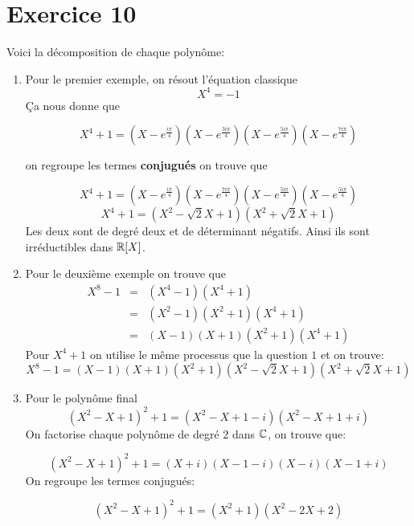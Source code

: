 \documentclass{report}
\begin{document}
\section{Exercice 10}
\begin{myproof}
  Voici la décomposition  de chaque polynôme:

  \begin{enumerate}
    \item Pour le premier exemple, on résout  l'équation classique
      $$
      X^4 = -1
      $$
      Ça nous donne que 

      $$
      X^4 + 1 = (X-e^{\frac{i\pi}{4}})(X-e^{\frac{3i\pi}{4}})(X-e^{\frac{5i\pi}{4}})(X-e^{\frac{7i\pi}{4}})
      $$

      on regroupe les termes \textbf{conjugués} on trouve que

      $$
      X^4 + 1 =(X-e^{\frac{i\pi}{4}})(X-e^{\frac{7i\pi}{4}}) (X-e^{\frac{5i\pi}{4}})(X-e^{\frac{5i\pi}{4}})
      $$ $$ X^4 + 1 = (X^2 - \sqrt{2}X + 1)(X^2 + \sqrt{2}X +1)
      $$
      Les deux sont de degré deux et de déterminant négatifs. Ainsi ils sont irréductibles dans $\mathbb{R}[X]$.
    \item Pour le deuxième exemple on trouve que
      \begin{eqnarray*}
        X^8 - 1 &=& (X^4 - 1)(X^4 + 1 )\\
         &=& (X^2 - 1)(X^2 + 1)(X^4 + 1)\\
         &=& (X-1)(X+1)(X^2+1)(X^4 +1)
    \end{eqnarray*}
    Pour $X^4 + 1$ on utilise le même processus que la question $1$ et on trouve:
    $$
    X^8 - 1 = (X-1)(X+1)(X^2+1)(X^2 - \sqrt{2}X + 1)(X^2 + \sqrt{2}X +1)
    $$
  \item Pour le polynôme final
    $$
    (X^2 - X + 1)^2 + 1 = (X^2 - X + 1 -i)(X^2 - X + 1 + i)
    $$
    On factorise chaque polynôme de degré $2$ dans $\mathbb{C}$, on trouve que:

    $$
    (X^2 - X + 1)^2 + 1 = (X+i)(X-1-i)(X-i)(X-1+i)
    $$
    On regroupe les termes conjugués:

    $$
    (X^2 - X + 1)^2 + 1 = (X^2 + 1)(X^2-2X + 2)
    $$
  \end{enumerate}
\end{myproof}
\end{document}
